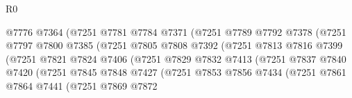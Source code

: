 \begin{lexlean}{R0}
\begin{coremodule}
                                    @7776
                                    @7364
                                    (@7251
                                      @7781
                                      @7784
                                      @7371
                                      (@7251
                                        @7789
                                        @7792
                                        @7378
                                        (@7251
                                          @7797
                                          @7800
                                          @7385
                                          (@7251
                                            @7805
                                            @7808
                                            @7392
                                            (@7251
                                              @7813
                                              @7816
                                              @7399
                                              (@7251
                                                @7821
                                                @7824
                                                @7406
                                                (@7251
                                                  @7829
                                                  @7832
                                                  @7413
                                                  (@7251
                                                    @7837
                                                    @7840
                                                    @7420
                                                    (@7251
                                                      @7845
                                                      @7848
                                                      @7427
                                                      (@7251
                                                        @7853
                                                        @7856
                                                        @7434
                                                        (@7251
                                                          @7861
                                                          @7864
                                                          @7441
                                                          (@7251
                                                            @7869
                                                            @7872

\end{coremodule}
\end{lexlean}
